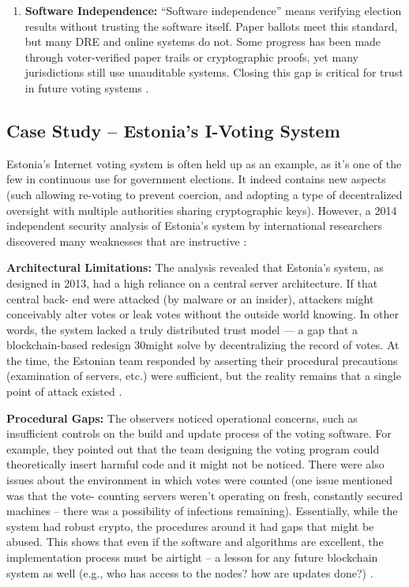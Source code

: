 \documentclass[a4paper,10pt]{report}
\begin{document}
\begin{enumerate}
    \item \textbf{Software Independence:} “Software independence” means verifying election results without trusting the software itself. Paper ballots meet this standard, but many DRE and online systems do not. Some progress has been made through voter-verified paper trails or cryptographic proofs, yet many jurisdictions still use unauditable systems. Closing this gap is critical for trust in future voting systems \cite{brookings_paper_voting, pmc_ncbi}.
\end{enumerate}

\subsection{Case Study -- Estonia’s I-Voting System}

Estonia’s Internet voting system is often held up as an example, as it’s one of the few in continuous use for government elections.  It indeed contains new aspects (such allowing re-voting to prevent coercion, and adopting a type of decentralized oversight with multiple authorities sharing cryptographic keys).  However, a 2014 independent security analysis of Estonia’s system by international researchers discovered many weaknesses that are instructive \cite{jhalderm_website}:

  \textbf  {Architectural Limitations:}   The analysis revealed that Estonia’s system, as designed in 2013, had a high reliance on a central server architecture.  If that central back- end were attacked (by malware or an insider), attackers might conceivably alter votes or leak votes without the outside world knowing.  In other words, the system lacked a truly distributed trust model — a gap that a blockchain-based redesign 30might solve by decentralizing the record of votes.  At the time, the Estonian team responded by asserting their procedural precautions (examination of servers, etc.) were sufficient, but the reality remains that a single point of attack existed \cite{jhalderm_website}.

  \textbf  {Procedural Gaps:}   The observers noticed operational concerns, such as insufficient controls on the build and update process of the voting software.  For example, they pointed out that the team designing the voting program could theoretically insert harmful code and it might not be noticed.  There were also issues about the environment in which votes were counted (one issue mentioned was that the vote- counting servers weren’t operating on fresh, constantly secured machines – there was a possibility of infections remaining).  Essentially, while the system had robust crypto, the procedures around it had gaps that might be abused.  This shows that even if the software and algorithms are excellent, the implementation process must be airtight – a lesson for any future blockchain system as well (e.g., who has access to the nodes?  how are updates done?)  \cite{jhalderm_website}.
\end{document}
